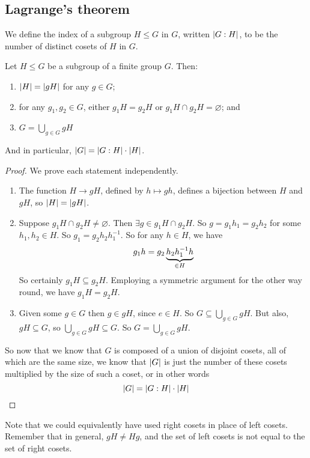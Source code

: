 \subsection{Lagrange's theorem}
\begin{definition}
	We define the index of a subgroup \(H \leq G\) in \(G\), written \(\abs{G : H}\), to be the number of distinct cosets of \(H\) in \(G\).
\end{definition}
\begin{theorem}
	Let \(H \leq G\) be a subgroup of a finite group \(G\).
	Then:
	\begin{enumerate}
		\item \(\abs{H} = \abs{gH}\) for any \(g \in G\);
		\item for any \(g_1, g_2 \in G\), either \(g_1 H = g_2 H\) or \(g_1 H \cap g_2 H = \varnothing\); and
		\item \(G = \bigcup_{g \in G} gH\)
	\end{enumerate}
	And in particular, \(\abs{G} = \abs{G : H} \cdot \abs{H}\).
\end{theorem}
\begin{proof}
	We prove each statement independently.
	\begin{enumerate}
		\item The function \(H \to gH\), defined by \(h \mapsto gh\), defines a bijection between \(H\) and \(gH\), so \(\abs{H} = \abs{gH}\).
		\item Suppose \(g_1 H \cap g_2 H \neq \varnothing\).
		      Then \(\exists g \in g_1 H \cap g_2 H\).
		      So \(g = g_1 h_1 = g_2 h_2\) for some \(h_1, h_2 \in H\).
		      So \(g_1 = g_2 h_2 h_1^{-1}\).
		      So for any \(h \in H\), we have
		      \[
			      g_1 h = g_2 \underbrace{h_2 h_1^{-1} h}_{\mathclap{\in H}}
		      \]
		      So certainly \(g_1 H \subseteq g_2 H\).
		      Employing a symmetric argument for the other way round, we have \(g_1 H = g_2 H\).
		\item Given some \(g \in G\) then \(g \in gH\), since \(e \in H\).
		      So \(G \subseteq \bigcup_{g \in G} gH\).
		      But also, \(gH \subseteq G\), so \(\bigcup_{g \in G} gH \subseteq G\).
		      So \(G = \bigcup_{g \in G} gH\).
	\end{enumerate}
	So now that we know that \(G\) is composed of a union of disjoint cosets, all of which are the same size, we know that \(\abs{G}\) is just the number of these cosets multiplied by the size of such a coset, or in other words
	\[
		\abs{G} = \abs{G : H} \cdot \abs{H}
	\]
\end{proof}
Note that we could equivalently have used right cosets in place of left cosets.
Remember that in general, \(gH \neq Hg\), and the set of left cosets is not equal to the set of right cosets.


